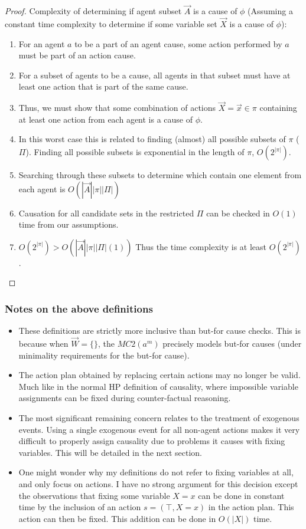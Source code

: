 \documentclass{article}
\theoremstyle{plain}
\theoremstyle{definition}
\begin{document}
\begin{proof}
Complexity of determining if agent subset $\vec{A}$ is a cause of $\phi$ (Assuming a constant time complexity to determine if some variable set $\vec{X}$ is a cause of $\phi$):

\begin{enumerate}
\item For an agent $a$ to be a part of an agent cause, some action performed by $a$ must be part of an action cause.
\item For a subset of agents to be a cause, all agents in that subset must have at least one action that is part of the same cause.
\item Thus, we must show that some combination of actions $\vec{X}=\vec{x} \in \pi$ containing at least one action from each agent is a cause of $\phi$.
\item In this worst case this is related to finding (almost) all possible subsets of $\pi$ ($\Pi$). Finding all possible subsets is exponential in the length of $\pi$, $O(2^{|\pi|})$.
\item Searching through these subsets to determine which contain one element from each agent is $O(|\vec{A}||\pi||\Pi|)$
\item Causation for all candidate sets in the restricted $\Pi$ can be checked in $O(1)$ time from our assumptions.
\item $O(2^{|\pi|}) > O(|\vec{A}||\pi||\Pi|(1)) $ Thus the time complexity is at least $O(2^{|\pi|})$.
\end{enumerate}
\end{proof}


\subsubsection*{Notes on the above definitions}
\begin{itemize}
\item These definitions are strictly more inclusive than but-for cause checks. This is because when $\vec{W}=\{\}$, the $MC2(a^m)$ precisely models but-for causes (under minimality requirements for the but-for cause).
\item The action plan obtained by replacing certain actions may no longer be valid. Much like in the normal HP definition of causality, where impossible variable assignments can be fixed during counter-factual reasoning.
\item The most significant remaining concern relates to the treatment of exogenous events. Using a single exogenous event for all non-agent actions makes it very difficult to properly assign causality due to problems it causes with fixing variables. This will be detailed in the next section.
\item One might wonder why my definitions do not refer to fixing variables at all, and only focus on actions. I have no strong argument for this decision except the observations that fixing some variable $X=x$ can be done in constant time by the inclusion of an action $s=(\top,X=x)$ in the action plan. This action can then be fixed. This addition can be done in $O(|X|)$ time.
\end{itemize}
\end{document}
